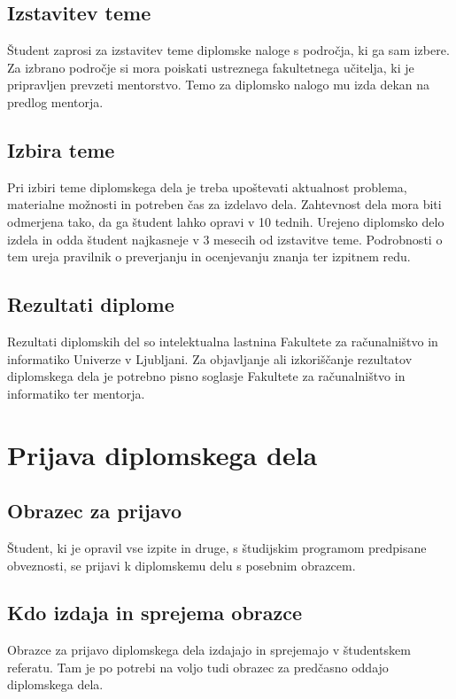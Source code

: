 \documentclass[12pt,a4paper]{book}
\begin{document}
\section{Izstavitev teme} 
Študent  zaprosi za izstavitev teme diplomske naloge s področja, ki ga sam izbere. Za  izbrano področje si mora poiskati ustreznega
fakultetnega učitelja, ki je pripravljen prevzeti mentorstvo. Temo za diplomsko nalogo mu izda dekan na predlog mentorja. 

\section{Izbira teme}
Pri izbiri teme diplomskega dela je treba upoštevati aktualnost problema, materialne možnosti in potreben čas za izdelavo dela.
Zahtevnost dela mora biti odmerjena tako, da ga študent lahko opravi v 10 tednih. Urejeno diplomsko delo izdela in odda študent najkasneje v 3
mesecih od izstavitve teme. Podro\-bnosti o tem ureja pravilnik o preverjanju in ocenjevanju znanja ter izpitnem redu.

\section{Rezultati diplome}
Rezultati diplomskih del so intelektualna lastnina Fakultete za ra\-ču\-nal\-niš\-tvo in informatiko Univerze v Ljubljani. Za
objavljanje ali izkoriščanje rezultatov diplomskega dela je potrebno pisno soglasje Fakultete za ra\-ču\-nal\-niš\-tvo in informatiko ter
mentorja.



\chapter{Prijava diplomskega dela}

\section{Obrazec za prijavo} 
Študent, ki je opravil vse izpite in druge, s študijskim programom predpisane obveznosti, se prijavi k diplomskemu delu s posebnim
obrazcem. 

\section{Kdo izdaja in sprejema obrazce} 
Obrazce za prijavo diplomskega dela izdajajo in sprejemajo v študentskem referatu. 
Tam je po potrebi na voljo tudi obrazec za predčasno oddajo diplom\-skega dela.
\end{document}
